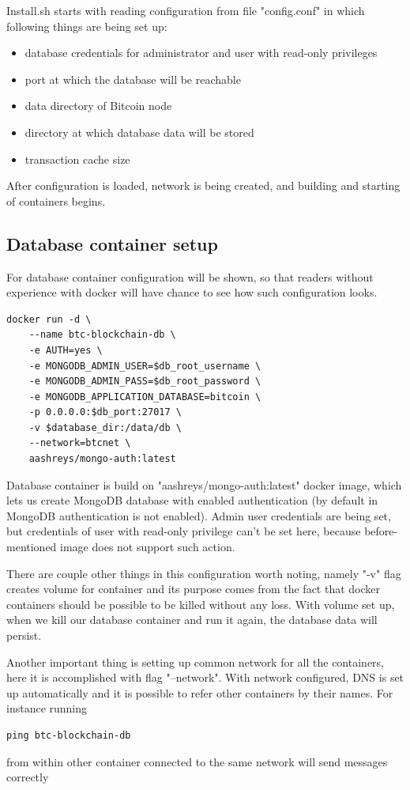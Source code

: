 \documentclass[12pt, en, eng, oneside, final]{mgr}
\begin{document}
Install.sh starts with reading configuration from file "config.conf" in which following things are being set up:

\begin{itemize}
\item
database credentials for administrator and user with read-only privileges
\item
port at which the database will be reachable
\item
data directory of Bitcoin node
\item
directory at which database data will be stored
\item
transaction cache size
\end{itemize} 

After configuration is loaded, network is being created, and building and starting of containers begins.

\subsection{Database container setup}
For database container configuration will be shown, so that readers without experience with docker will have chance to see how such configuration looks.

\begin{verbatim}
docker run -d \
    --name btc-blockchain-db \
    -e AUTH=yes \
    -e MONGODB_ADMIN_USER=$db_root_username \
    -e MONGODB_ADMIN_PASS=$db_root_password \
    -e MONGODB_APPLICATION_DATABASE=bitcoin \
    -p 0.0.0.0:$db_port:27017 \
    -v $database_dir:/data/db \
    --network=btcnet \
    aashreys/mongo-auth:latest
\end{verbatim}

Database container is build on "aashreys/mongo-auth:latest"\cite{mongo-auth} docker image, which lets us create MongoDB database with enabled authentication (by default in MongoDB authentication is not enabled).
Admin user credentials are being set, but credentials of user with read-only privilege can't be set here, because before-mentioned image does not support such action.

There are couple other things in this configuration worth noting, namely "-v" flag creates volume for container and its purpose comes from the fact that docker containers should be possible to be killed without any loss. With volume set up, when we kill our database container and run it again, the database data will persist.

Another important thing is setting up common network for all the containers, here it is accomplished with flag "--network". With network configured, DNS is set up automatically and it is possible to refer other containers by their names. For instance running 
\begin{verbatim}
ping btc-blockchain-db
\end{verbatim}  
from within other container connected to the same network will send messages correctly
\end{document}
